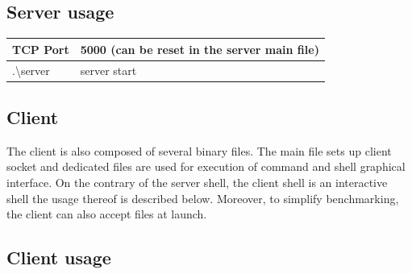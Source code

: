 \documentclass[a4paper,11pt]{report}
\begin{document}
    \subsection*{Server usage}

    \begin{centering}
        \begin{tabular}{|m{3cm}|m{7cm}|}
            \hline
            TCP Port & 5000 (can be reset in the server main file) \\
            \hline
            .\textbackslash server & server start \\
            \hline
        \end{tabular}
    \end{centering}

    \subsection*{Client}
    The client is also composed of several binary files.
    The main file sets up client socket and dedicated files are used for execution of command and shell graphical
    interface.
    On the contrary of the server shell, the client shell is an interactive shell the usage thereof is described below.
    Moreover, to simplify benchmarking, the client can also accept files at launch.

    \subsection*{Client usage}
\end{document}
